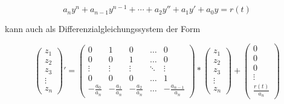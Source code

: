 \documentclass[12pt, a4paper]{scrreprt}
\begin{document}
\[
  a_ny^{n} + a_{n-1}y^{n-1} + \cdots + a_2y'' + a_1y' + a_0y = r(t)
\]

kann auch als Differenzialgleichungssystem der Form

\[
  \begin{pmatrix}
    z_1\\
    z_2\\
    z_3\\
    \vdots\\
    z_n
  \end{pmatrix} ' =
  \begin{pmatrix}
    0 & 1 & 0 & \dots & 0\\
    0 & 0 & 1 & \dots & 0\\
    \vdots & \vdots & \vdots & \ddots & \vdots\\
    0 & 0 & 0 & \dots & 1\\
    - \frac{a_0}{a_n} & - \frac{a_1}{a_n} & - \frac{a_2}{a_n} & \dots & - \frac{a_{n-1}}{a_n}
  \end{pmatrix} *
  \begin{pmatrix}
    z_1\\
    z_2\\
    z_3\\
    \vdots\\
    z_n
  \end{pmatrix} +
  \begin{pmatrix}
    0\\
    0\\
    0\\
    \vdots\\
    \frac{r(t)}{a_n}
  \end{pmatrix}
\]
\end{document}
